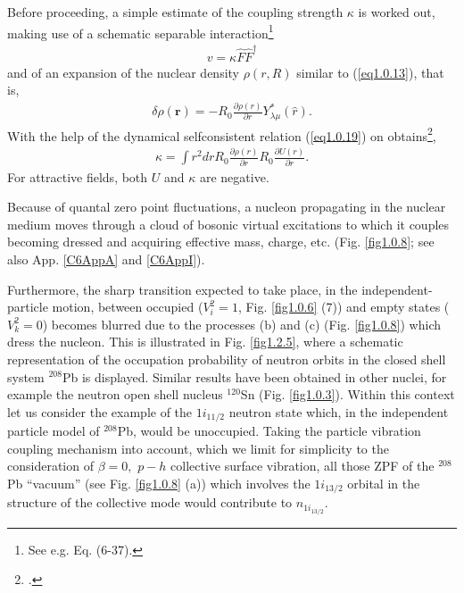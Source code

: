 Before proceeding, a simple estimate of the coupling strength $\kappa$ is worked out, making use of a schematic separable interaction\footnote{See e.g. \cite{Bohr:75} Eq. (6-37).}
\begin{align}\label{eq1.2.9}
v=\kappa\hat F\hat F^\dagger
\end{align}
and of an expansion of the nuclear density $\rho(r,R)$ similar to (\ref{eq1.0.13}), that is,
\begin{align}\label{eq1.2.10}
\delta\rho(\mathbf r)=-R_0\frac{\partial\rho(r)}{\partial r} Y^*_{\lambda\mu}(\hat r).
\end{align}
With the help of the dynamical selfconsistent relation (\ref{eq1.0.19}) on obtains\footnote{\cite{Bohr:75}.},
\begin{align}\label{eq1.2.11}
\kappa=\int r^2 dr R_0\frac{\partial\rho(r)}{\partial r}R_0\frac{\partial U(r)}{\partial r}.
\end{align}
For attractive fields, both $U$ and $\kappa$ are negative.


Because of quantal zero point fluctuations, a nucleon propagating in the nuclear medium moves through a cloud of bosonic  virtual excitations to which it couples becoming dressed and acquiring  effective mass, charge, etc. (Fig. \ref{fig1.0.8}; see also App. \ref{C6AppA} and \ref{C6AppI}). 


Furthermore, the sharp transition expected to take place, in the independent-particle motion, between occupied ($V^2_i=1$, Fig. \ref{fig1.0.6} (7)) and empty states ($V^2_k=0$) becomes blurred due to the processes (b) and (c) (Fig. \ref{fig1.0.8}) which dress the nucleon. This is illustrated in Fig. \ref{fig1.2.5}, where a schematic representation of the occupation probability of neutron orbits in the closed shell system $^{208}$Pb is displayed. Similar results have been obtained in other nuclei, for example the neutron open shell nucleus $^{120}$Sn (Fig. \ref{fig1.0.3}). Within this context let us consider the example of the $1i_{11/2}$ neutron state which, in the independent particle model of $^{208}$Pb, would be unoccupied. Taking the particle vibration coupling mechanism into account, which we limit for simplicity to the consideration of $\beta=0,$ $p-h$ collective surface vibration, all those ZPF of the $^{208}$Pb ``vacuum'' (see Fig. \ref{fig1.0.8} (a)) which involves the $1i_{13/2}$ orbital in the structure of the collective mode would contribute to $n_{1i_{13/2}}$.

